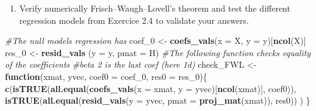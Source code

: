 \documentclass[]{book}
\newenvironment{Shaded}{\begin{snugshade}}{\end{snugshade}}
\newcommand{\CommentTok}[1]{\textcolor[rgb]{0.56,0.35,0.01}{\textit{#1}}}
\newcommand{\ControlFlowTok}[1]{\textcolor[rgb]{0.13,0.29,0.53}{\textbf{#1}}}
\newcommand{\DataTypeTok}[1]{\textcolor[rgb]{0.13,0.29,0.53}{#1}}
\newcommand{\DecValTok}[1]{\textcolor[rgb]{0.00,0.00,0.81}{#1}}
\newcommand{\KeywordTok}[1]{\textcolor[rgb]{0.13,0.29,0.53}{\textbf{#1}}}
\newcommand{\NormalTok}[1]{#1}
\newcommand{\StringTok}[1]{\textcolor[rgb]{0.31,0.60,0.02}{#1}}
\providecommand{\tightlist}{%
  \setlength{\itemsep}{0pt}\setlength{\parskip}{0pt}}
\theoremstyle{definition}
\theoremstyle{definition}
\theoremstyle{definition}
\theoremstyle{remark}
\begin{document}
\begin{enumerate}
\def\labelenumi{\alph{enumi}.}
\setcounter{enumi}{4}
\tightlist
\item
  Verify numerically Frisch--Waugh--Lovell's theorem and test the different regression models from Exercice 2.4 to validate your answers.
\end{enumerate}

\begin{Shaded}
\begin{Highlighting}[]
\CommentTok{#The null models regression has}
\NormalTok{coef_}\DecValTok{0}\NormalTok{ <-}\StringTok{ }\KeywordTok{coefs_vals}\NormalTok{(}\DataTypeTok{x =}\NormalTok{ X, }\DataTypeTok{y =}\NormalTok{ y)[}\KeywordTok{ncol}\NormalTok{(X)]}
\NormalTok{res_}\DecValTok{0}\NormalTok{  <-}\StringTok{ }\KeywordTok{resid_vals}\NormalTok{ (}\DataTypeTok{y =}\NormalTok{ y, }\DataTypeTok{pmat =}\NormalTok{ H)}
\CommentTok{#The following function checks equality of the coefficients}
\CommentTok{#beta 2 is the last coef (here 1d)}
\NormalTok{check_FWL <-}\StringTok{ }\ControlFlowTok{function}\NormalTok{(xmat, yvec, }\DataTypeTok{coef0 =}\NormalTok{ coef_}\DecValTok{0}\NormalTok{, }\DataTypeTok{res0 =}\NormalTok{ res_}\DecValTok{0}\NormalTok{)\{}
  \KeywordTok{c}\NormalTok{(}\KeywordTok{isTRUE}\NormalTok{(}\KeywordTok{all.equal}\NormalTok{(}\KeywordTok{coefs_vals}\NormalTok{(}\DataTypeTok{x =}\NormalTok{ xmat, }\DataTypeTok{y =}\NormalTok{ yvec)[}\KeywordTok{ncol}\NormalTok{(xmat)], coef0)),}
    \KeywordTok{isTRUE}\NormalTok{(}\KeywordTok{all.equal}\NormalTok{(}\KeywordTok{resid_vals}\NormalTok{(}\DataTypeTok{y =}\NormalTok{ yvec, }\DataTypeTok{pmat =} \KeywordTok{proj_mat}\NormalTok{(xmat)), res0))}
\NormalTok{  )}
\NormalTok{\}}


\end{Highlighting}
\end{Shaded}
\end{document}
